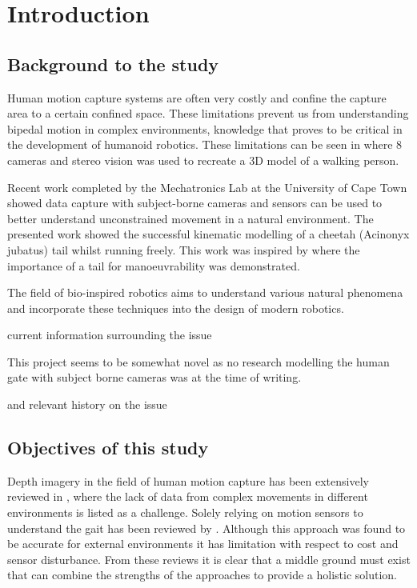 \chapter{Introduction}

\section{Background to the study}
Human motion capture systems are often very costly and confine the capture area to a certain confined space. These limitations prevent us from understanding bipedal motion in complex environments, knowledge that proves to be critical in the development of humanoid robotics. These limitations can be seen in \cite{sandau2014markerless} where 8 cameras and stereo vision was used to recreate a 3D model of a walking person. 

Recent work \cite{patel2017trackingieee} completed by the Mechatronics Lab at the University of Cape Town showed data capture with subject-borne cameras and sensors can be used to better understand unconstrained movement in a natural environment. The presented work showed the successful kinematic modelling of a cheetah (Acinonyx jubatus) tail whilst running freely. This work was inspired by \cite{patel2014rapid} where the importance of a tail for manoeuvrability was demonstrated.
 

The field of bio-inspired robotics aims to understand various natural phenomena and incorporate these techniques into the design of modern robotics. 

current information surrounding the issue 


This project seems to be somewhat novel as no research modelling the human gate with subject borne cameras was  at the time of writing. 

and relevant history on the issue
  
\section{Objectives of this study}
Depth imagery in the field of human motion capture has been extensively reviewed in \cite{chen2013survey}, where the lack of data from complex movements in different environments is listed as a challenge. Solely relying on motion sensors to understand the gait has been reviewed by \cite{picerno201725}. Although this approach was found to be accurate for external environments it has limitation with respect to cost and sensor disturbance. From these reviews it is clear that a middle ground must exist that can combine the strengths of the approaches to provide a holistic solution.

